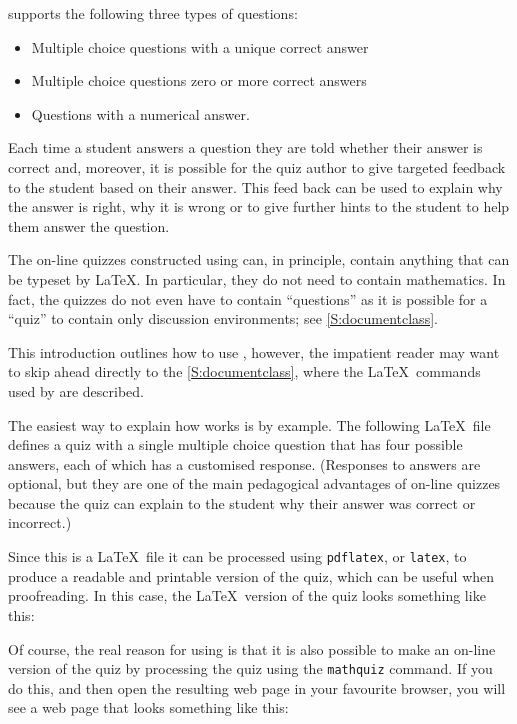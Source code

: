 \documentclass[svgnames]{article}
\begin{document}
    \MathQuiz supports the following three types of questions:
    \begin{itemize}
      \item Multiple choice questions with a unique correct answer
      \item Multiple choice questions zero or more correct answers
      \item Questions with a numerical answer.
    \end{itemize}
    Each time a student answers a question they are told whether their
    answer is correct and, moreover, it is possible for the quiz author
    to give targeted feedback to the student based on their answer. This
    feed back can be used to explain why the answer is right, why it is
    wrong or to give further hints to the student to help them answer the
    question.

    The on-line quizzes constructed using \MathQuiz can, in principle,
    contain anything that can be typeset by \LaTeX. In particular, they
    do not need to contain mathematics. In fact, the quizzes do not even
    have to contain ``questions'' as it is possible for a \MathQuiz
    ``quiz'' to contain only \textsf{discussion} environments; see
    \autoref{S:documentclass}.

    This introduction outlines how to use \MathQuiz, however, the
    impatient reader may want to skip ahead directly to the
    \autoref{S:documentclass}, where the \LaTeX\ commands used by
    \MathQuiz are described.

    The easiest way to explain how \MathQuiz works is by example. The
    following \LaTeX\ file defines a quiz with a single multiple choice
    question that has four possible answers, each of which has a
    customised response.  (Responses to answers are optional, but they
    are one of the main pedagogical advantages of on-line quizzes
    because the quiz can explain to the student why their answer was
    correct or incorrect.)

    

    Since this is a \LaTeX\ file it can be processed using
    \texttt{pdflatex}, or \texttt{latex}, to produce a readable and
    printable version of the quiz, which can be useful when
    proofreading. In this case, the \LaTeX\ version of the quiz looks
    something like this:


    Of course, the real reason for using \MathQuiz is that it is also
    possible to make an on-line version of the quiz by processing the
    quiz using the \texttt{mathquiz} command. If you do this, and then open
    the resulting web page in your favourite browser, you will see a web page
    that looks something like this:
\end{document}
